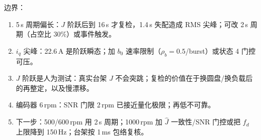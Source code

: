 \documentclass[11pt,a4paper]{article}
\newcommand{\Jhat}{\hat J}
\newcommand{\bzero}{b_0}
\begin{document}
边界：
\begin{enumerate}
  \item 5\,s 周期偏长：$J$ 阶跃后到 16\,s 才复检，1.4\,s 失配造成 RMS 尖峰；可改 2\,s 周期（占空比 30\%）或事件触发。
  \item $i_q$ 尖峰：22.6\,A 是阶跃瞬态；加 $\bzero$ 速率限制（$\rho_b=0.5$/burst）或状态 4 门控可压。
  \item $J$ 阶跃是人为测试：真实台架 $J$ 不会突跳；复检的价值在于换圆盘/换负载后的再整定，以及慢漂移。
  \item 编码器 6\,rpm：SNR 门限 2\,rpm 已接近量化极限；再低不可靠。
  \item 下一步：500/600\,rpm 用 2\,s 周期；1000\,rpm 加 $\Jhat$ 一致性/SNR 门控或把 $f_d$ 上限降到 150\,Hz；台架按 1\,ms 包络复核。
\end{enumerate}
\end{document}
